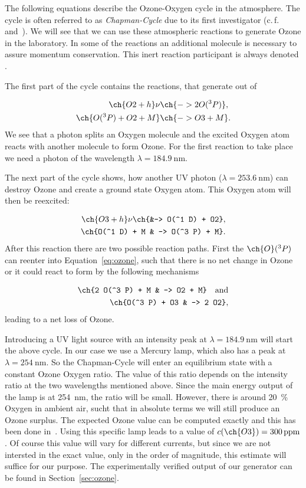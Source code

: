 The following equations describe the Ozone-Oxygen cycle in the
atmosphere.  The cycle is often referred to as \emph{Chapman-Cycle}
due to its first investigator (c.\,f.~\cite{chapman}
and~\cite{roedel}). We will see that we can use these atmospheric
reactions to generate Ozone in the laboratory. In some of the
reactions an additional molecule is necessary to assure momentum
conservation. This inert reaction participant is always denoted
.

The first part of the cycle contains the reactions, that generate
 out of 

\begin{align}
  \ch{O2 + h}\nu &\ch{-> 2 O(^3P)},\nonumber\\
  \ch{O(^3 P) + O2 + M} &\ch{-> O3 + M}. \label{eq:ozone}
\end{align}
We see that a photon splits an Oxygen molecule and the excited
Oxygen atom reacts with another  molecule to form Ozone. For
the first reaction to take place we need a photon of the wavelength
$\lambda = \SI{184.9}{\nano\meter}$.

The next part of the cycle shows, how another UV photon ($\lambda =
\SI{253.6}{\nano\meter}$) can destroy
Ozone and create a ground state Oxygen atom. This Oxygen atom will
then be reexcited:

\begin{align}
  \ch{O3 + h}\nu \ch{&-> O(^1 D) +
  O2}, \label{eq:split}\\
  \ch{O(^1 D) + M & -> O(^3 P) + M}.\nonumber
\end{align}
After this reaction there are two possible reaction paths. First the $\ch{O}(^3
P)$ can reenter into Equation~\eqref{eq:ozone}, such that there is no
net change in Ozone or it could react to form  by the
following mechanisms

\begin{align*}
  \ch{2 O(^3 P) + M & -> O2 + M} \quad \text{and}\\
  \ch{O(^3 P) + O3 & -> 2 O2},
\end{align*}
leading to a net loss of Ozone. 

Introducing a UV light source with
an intensity peak at $\lambda = \SI{184.9}{\nano\meter}$
will start the above cycle. In our case we use a Mercury lamp, which
also has a peak at $\lambda = \SI{254}{\nano\meter}$. So the
Chapman-Cycle will enter an equilibrium state with a constant Ozone
Oxygen ratio. The value of this ratio depends on the
intensity ratio at the two wavelengths mentioned above. Since the
main energy output of the lamp is at \SI{254}{\nano\meter}, the ratio
will be small. However, there is around \SI{20}{\%} Oxygen in ambient
air, sucht that in absolute terms we will still produce an Ozone
surplus. The expected Ozone value can be computed exactly and this has been
done in~\cite{bsc}. Using this specific lamp leads to a value of
$c(\ch{O3}) = \SI{300}{ppm}$. Of course this value will vary for
different currents, but since we are not intersted in the exact value,
only in the order of magnitude, this estimate will suffice for our
purpose. The experimentally verified output of our generator can be
found in Section~\ref{sec:ozone}.

